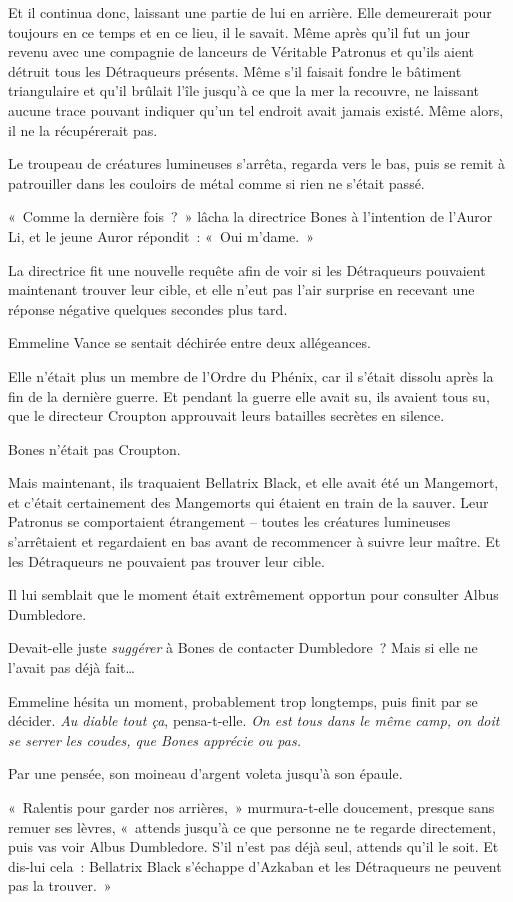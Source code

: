 Et il continua donc, laissant une partie de lui en arrière. Elle demeurerait pour toujours en ce temps et en ce lieu, il le savait. Même après qu'il fut un jour revenu avec une compagnie de lanceurs de Véritable Patronus et qu'ils aient détruit tous les Détraqueurs présents. Même s'il faisait fondre le bâtiment triangulaire et qu'il brûlait l'île jusqu'à ce que la mer la recouvre, ne laissant aucune trace pouvant indiquer qu'un tel endroit avait jamais existé. Même alors, il ne la récupérerait pas.

\later

Le troupeau de créatures lumineuses s'arrêta, regarda vers le bas, puis se remit à patrouiller dans les couloirs de métal comme si rien ne s'était passé.

«~Comme la dernière fois~?~» lâcha la directrice Bones à l'intention de l'Auror Li, et le jeune Auror répondit~: «~Oui m'dame.~»

La directrice fit une nouvelle requête afin de voir si les Détraqueurs pouvaient maintenant trouver leur cible, et elle n'eut pas l'air surprise en recevant une réponse négative quelques secondes plus tard.

Emmeline Vance se sentait déchirée entre deux allégeances.

Elle n'était plus un membre de l'Ordre du Phénix, car il s'était dissolu après la fin de la dernière guerre. Et pendant la guerre elle avait su, ils avaient tous su, que le directeur Croupton approuvait leurs batailles secrètes en silence.

Bones n'était pas Croupton.

Mais maintenant, ils traquaient Bellatrix Black, et elle avait été un Mangemort, et c'était certainement des Mangemorts qui étaient en train de la sauver. Leur Patronus se comportaient étrangement -- toutes les créatures lumineuses s'arrêtaient et regardaient en bas avant de recommencer à suivre leur maître. Et les Détraqueurs ne pouvaient pas trouver leur cible.

Il lui semblait que le moment était extrêmement opportun pour consulter Albus Dumbledore.

Devait-elle juste \emph{suggérer} à Bones de contacter Dumbledore~? Mais si elle ne l'avait pas déjà fait…

Emmeline hésita un moment, probablement trop longtemps, puis finit par se décider. \emph{Au diable tout ça}, pensa-t-elle. \emph{On est tous dans le même camp, on doit se serrer les coudes, que Bones apprécie ou pas.}

Par une pensée, son moineau d'argent voleta jusqu'à son épaule.

«~Ralentis pour garder nos arrières,~» murmura-t-elle doucement, presque sans remuer ses lèvres, «~attends jusqu'à ce que personne ne te regarde directement, puis vas voir Albus Dumbledore. S'il n'est pas déjà seul, attends qu'il le soit. Et dis-lui cela~: Bellatrix Black s'échappe d'Azkaban et les Détraqueurs ne peuvent pas la trouver.~»
